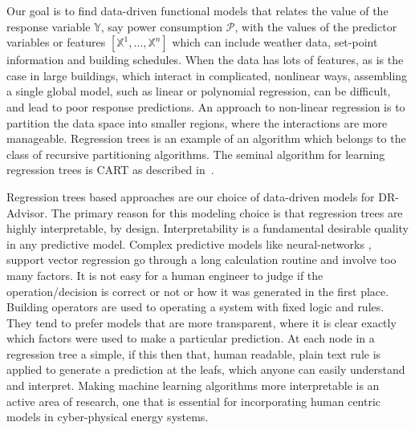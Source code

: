 Our goal is to find data-driven functional models that relates the value of the response variable $\mathbb{Y}$, say power consumption $\mathcal{P}$, with the values of the predictor variables or features $\left[ \mathbb{X}^1,\dots,\mathbb{X}^n \right]$ which can include weather data, set-point information and building schedules.
When the data has lots of features, as is the case in large buildings, which interact in complicated, nonlinear ways, assembling a single global model, such as linear or polynomial regression, can be difficult, and lead to poor response predictions.
An approach to non-linear regression is to partition the data space into smaller regions, where the interactions are more manageable. 
Regression trees is an example of an algorithm which belongs to the class of recursive partitioning algorithms. The seminal algorithm for learning regression trees is CART as described in~\cite{breiman1984classification}. 

Regression trees based approaches are our choice of data-driven models for DR-Advisor. The primary reason for this modeling choice is that regression trees are highly interpretable, by design.
Interpretability is a fundamental desirable quality in any predictive model.  
Complex predictive models like neural-networks , support vector regression \etc go through a long calculation routine and involve too many factors. 
It is not easy for a human engineer to judge if the operation/decision is correct or not or how it was generated in the first place. 
Building operators are used to operating a system with fixed logic and rules. 
They tend to prefer models that are more transparent, where it is clear exactly which factors were used to make a particular prediction.
At each node in a regression tree a simple, if this then that, human readable, plain text rule is applied to generate a prediction at the leafs, which anyone can easily understand and interpret.
Making machine learning algorithms more interpretable is an active area of research, one that is essential for incorporating human centric models in cyber-physical energy systems.

